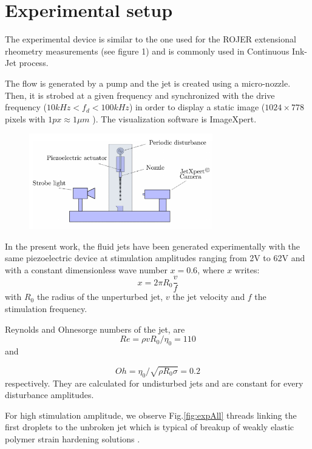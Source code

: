 \documentclass[twocolumn,10pt]{asme2ej}
\begin{document}
\section{Experimental setup}
The experimental device is similar to the one used for the ROJER extensional rheometry measurements \cite{rodriguez2015experimental} (see figure 1) and is commonly used in Continuous Ink-Jet process. 

The flow is generated by a pump and the jet is created using a micro-nozzle. Then, it is strobed at a given frequency and synchronized with the drive frequency ($10 kHz < f_d < 100 kHz$) in order to display a static image ($1024\times778$ pixels with $1 px \approx 1 \mu m$ ). 
The visualization software is ImageXpert.

\begin{figure}[h]
    \centering
    \includegraphics[width=8cm]{device.png}
    \caption{}
    \label{device}
\end{figure}

In the present work, the fluid jets have been generated experimentally with the same piezoelectric device at stimulation amplitudes ranging from 2V to 62V and with a constant dimensionless wave number $x = 0.6$, where $x$ writes:
\begin{equation}\label{eq:waveNbr}
    x=2 \pi R_0 \frac{v}{f}
\end{equation}
with $R_0$ the radius of the unperturbed jet, $v$ the jet velocity and $f$ the stimulation frequency. 

Reynolds and Ohnesorge numbers of the jet, are
\begin{equation}
    Re= \rho v R_0 / \eta_0 = 110
\end{equation} and 
   
\begin{equation}
    Oh=\eta_0/\sqrt{\rho R_0 \sigma} = 0.2
\end{equation}
respectively. They are calculated for undisturbed jets and are constant for every disturbance amplitudes.

For high stimulation amplitude, we observe Fig.\ref{fig:expAll} threads linking the first droplets to the unbroken jet which is typical of breakup of weakly elastic polymer strain hardening solutions \cite{christanti2002effect}.
\end{document}

